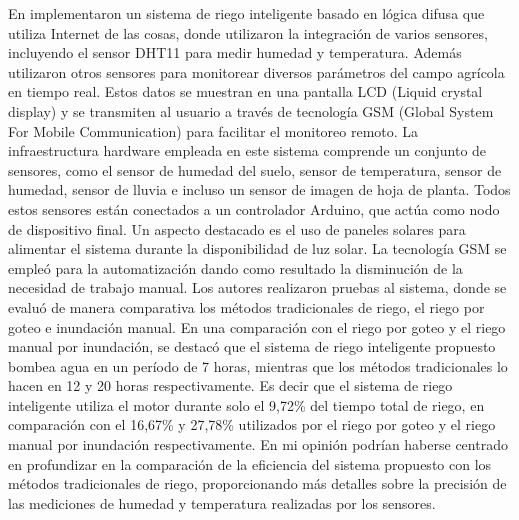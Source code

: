\bigbreak
En \cite{krishnan_fuzzy_2020} implementaron un sistema de riego inteligente basado en lógica difusa que utiliza Internet de las cosas, donde utilizaron la integración de varios sensores, incluyendo el sensor DHT11 para medir humedad y temperatura. Además utilizaron otros sensores para monitorear diversos parámetros del campo agrícola en tiempo real. Estos datos se muestran en una pantalla LCD (Liquid crystal display) y se transmiten al usuario a través de tecnología GSM (Global System For Mobile Communication) para facilitar el monitoreo remoto. La infraestructura hardware empleada en este sistema comprende un conjunto de sensores, como el sensor de humedad del suelo, sensor de temperatura, sensor de humedad, sensor de lluvia e incluso un sensor de imagen de hoja de planta. Todos estos sensores están conectados a un controlador Arduino, que actúa como nodo de dispositivo final. Un aspecto destacado es el uso de paneles solares para alimentar el sistema durante la disponibilidad de luz solar. La tecnología GSM se empleó para la automatización dando como resultado la disminución de la necesidad de trabajo manual. Los autores realizaron pruebas al sistema, donde se evaluó de manera comparativa los métodos tradicionales de riego, el riego por goteo e inundación manual. En una comparación con el riego por goteo y el riego manual por inundación, se destacó que el sistema de riego inteligente propuesto bombea agua en un período de 7 horas, mientras que los métodos tradicionales lo hacen en 12 y 20 horas respectivamente. Es decir que el sistema de riego inteligente utiliza el motor durante solo el 9,72\% del tiempo total de riego, en comparación con el 16,67\% y 27,78\% utilizados por el riego por goteo y el riego manual por inundación respectivamente. En mi opinión podrían haberse centrado en profundizar en la comparación de la eficiencia del sistema propuesto con los métodos tradicionales de riego, proporcionando más detalles sobre la precisión de las mediciones de humedad y temperatura realizadas por los sensores.

